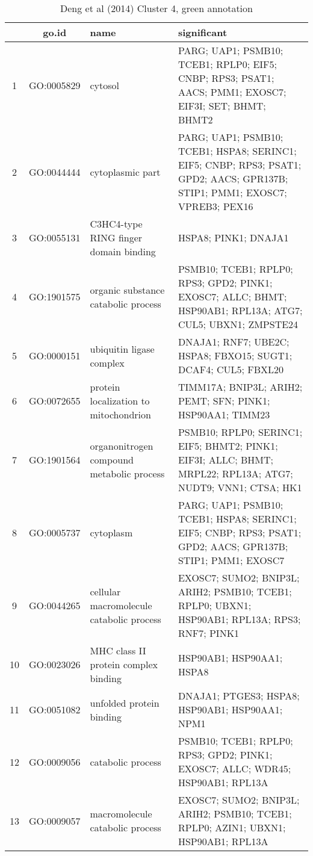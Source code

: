 \begin{table}[htp]
\begin{center}
\caption{Deng et al (2014) Cluster 4, green annotation} \label{tab:tab5}
\begin{tabular}{|c|c|p{1.5in}|p{4in}|}
  \hline
 & go.id & name & significant \\ 
  \hline
1 & GO:0005829 & cytosol & \footnotesize{PARG; UAP1; PSMB10; TCEB1; RPLP0; EIF5; CNBP; RPS3; PSAT1; AACS; PMM1; EXOSC7; EIF3I; SET; BHMT; BHMT2} \\ 
  2 & GO:0044444 & cytoplasmic part & \footnotesize{PARG; UAP1; PSMB10; TCEB1; HSPA8; SERINC1; EIF5; CNBP; RPS3; PSAT1; GPD2; AACS; GPR137B; STIP1; PMM1; EXOSC7; VPREB3; PEX16} \\ 
  3 & GO:0055131 & C3HC4-type RING finger domain binding & \footnotesize{HSPA8; PINK1; DNAJA1} \\ 
  4 & GO:1901575 & organic substance catabolic process & \footnotesize{PSMB10; TCEB1; RPLP0; RPS3; GPD2; PINK1; EXOSC7; ALLC; BHMT; HSP90AB1; RPL13A; ATG7; CUL5; UBXN1; ZMPSTE24} \\ 
  5 & GO:0000151 & ubiquitin ligase complex & \footnotesize{DNAJA1; RNF7; UBE2C; HSPA8; FBXO15; SUGT1; DCAF4; CUL5; FBXL20} \\ 
  6 & GO:0072655 & protein localization to mitochondrion & \footnotesize{TIMM17A; BNIP3L; ARIH2; PEMT; SFN; PINK1; HSP90AA1; TIMM23} \\ 
  7 & GO:1901564 & organonitrogen compound metabolic process & \footnotesize{PSMB10; RPLP0; SERINC1; EIF5; BHMT2; PINK1; EIF3I; ALLC; BHMT; MRPL22; RPL13A; ATG7; NUDT9; VNN1; CTSA; HK1} \\ 
  8 & GO:0005737 & cytoplasm & \footnotesize{PARG; UAP1; PSMB10; TCEB1; HSPA8; SERINC1; EIF5; CNBP; RPS3; PSAT1; GPD2; AACS; GPR137B; STIP1; PMM1; EXOSC7} \\ 
  9 & GO:0044265 & cellular macromolecule catabolic process & \footnotesize{EXOSC7; SUMO2; BNIP3L; ARIH2; PSMB10; TCEB1; RPLP0; UBXN1; HSP90AB1; RPL13A; RPS3; RNF7; PINK1} \\ 
10 & GO:0023026 & MHC class II protein complex binding & \footnotesize{HSP90AB1; HSP90AA1; HSPA8} \\ 
11 & GO:0051082 & unfolded protein binding & \footnotesize{DNAJA1; PTGES3; HSPA8; HSP90AB1; HSP90AA1; NPM1} \\ 
12 & GO:0009056 & catabolic process & \footnotesize{PSMB10; TCEB1; RPLP0; RPS3; GPD2; PINK1; EXOSC7; ALLC; WDR45; HSP90AB1; RPL13A} \\ 
13 & GO:0009057 & macromolecule catabolic process & \footnotesize{EXOSC7; SUMO2; BNIP3L; ARIH2; PSMB10; TCEB1; RPLP0; AZIN1; UBXN1; HSP90AB1; RPL13A} \\ 

\end{tabular}
\end{center}
\end{table}
